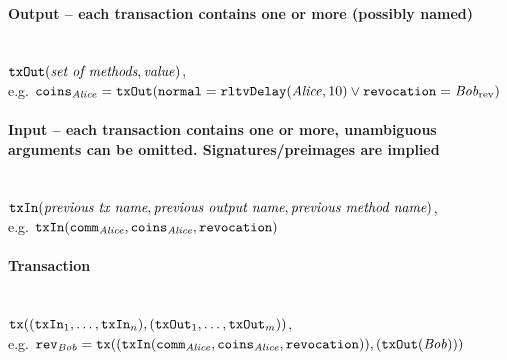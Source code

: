   \paragraph{Output -- each transaction contains one or more (possibly named)} \
  \\
    $\mathtt{txOut}(\text{\it set of methods}, \mathit{value})$, \\
    e.g. $\mathtt{coins}_{\mathit{Alice}} = \mathtt{txOut}(\mathtt{normal} = \mathtt{rltvDelay}(\mathit{Alice}, 10)
    \vee \mathtt{revocation} = \mathit{Bob}_{\mathrm{rev}})$

  \paragraph{Input -- each transaction contains one or more, unambiguous
  arguments can be omitted. Signatures/preimages are implied} \ \\
    $\mathtt{txIn}(\text{\it previous tx name}, \text{\it previous output name},
    \text{\it previous method name})$, \\
    e.g. $\mathtt{txIn}(\mathtt{comm}_{\mathit{Alice}}, \mathtt{coins}_{\mathit{Alice}},
    \mathtt{revocation})$

  \paragraph{Transaction} \ \\
    $\texttt{tx}((\mathtt{txIn}_1, \dots, \mathtt{txIn}_n), (\mathtt{txOut}_1, \dots, \mathtt{txOut}_m))$, \\
    e.g. $\mathtt{rev}_{\mathit{Bob}} = \texttt{tx}((\mathtt{txIn}(\mathtt{comm}_{\mathit{Alice}},
    \mathtt{coins}_{\mathit{Alice}}, \mathtt{revocation})), (\mathtt{txOut}(\mathit{Bob})))$
